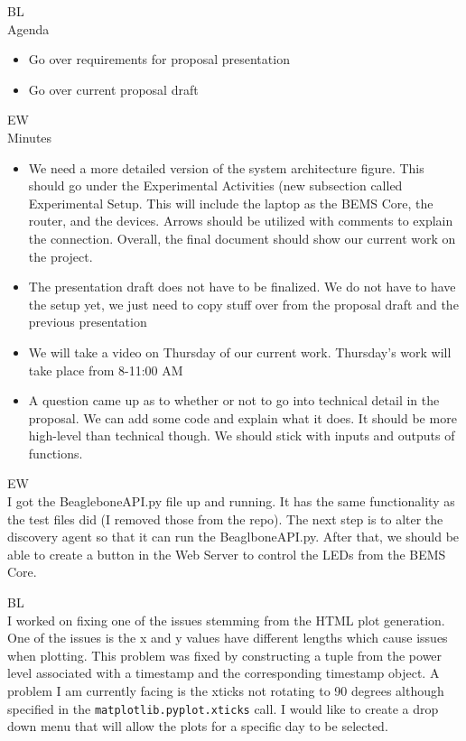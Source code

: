 \documentclass[fontsize=11pt, %
                             paper=letter, %
                             openany, %
                             captions=tableheading,
                             index=totoc,
                             hyperref]{labbook}
\begin{document}
BL\\
Agenda
\begin{itemize}
\item Go over requirements for proposal presentation
\item Go over current proposal draft
\end{itemize}


EW\\
Minutes
\begin{itemize}
\item We need a more detailed version of the system architecture figure. This should go under the Experimental Activities (new subsection called Experimental Setup. This will include the laptop as the BEMS Core, the router, and the devices. Arrows should be utilized with comments to explain the connection. Overall, the final document should show our current work on the project.
\item The presentation draft does not have to be finalized. We do not have to have the setup yet, we just need to copy stuff over from the proposal draft and the previous presentation
\item We will take a video on Thursday of our current work. Thursday's work will take place from 8-11:00 AM
\item A question came up as to whether or not to go into technical detail in the proposal. We can add some code and explain what it does. It should be more high-level than technical though. We should stick with inputs and outputs of functions.
\end{itemize}

EW\\
I got the BeagleboneAPI.py file up and running. It has the same functionality as the test files did (I removed those from the repo). The next step is to alter the discovery agent so that it can run the BeaglboneAPI.py. After that, we should be able to create a button in the Web Server to control the LEDs from the BEMS Core.

BL\\
I worked on fixing one of the issues stemming from the HTML plot generation. One of the issues is the x and y values have different lengths which cause issues when plotting. This problem was fixed by constructing a tuple from the power level associated with a timestamp and the corresponding timestamp object. A problem I am currently facing is the xticks not rotating to 90 degrees although specified in the \texttt{matplotlib.pyplot.xticks} call. I would like to create a drop down menu that will allow the plots for a specific day to be selected.
\end{document}
